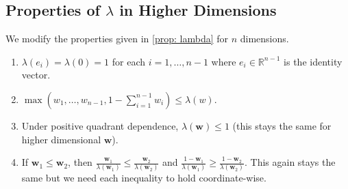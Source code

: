 \documentclass[12pt]{article}
\begin{document}
  \subsection{Properties of $\lambda$ in Higher Dimensions} \label{app: lambda highdim}
    We modify the properties given in \cref{prop: lambda} for $n$ dimensions.
    \begin{enumerate}
      \item $\lambda(e_i) = \lambda(0) = 1$ for each $i = 1,\dots,n-1$ where $e_i \in \mathbb{R}^{n - 1}$ is the identity vector.
      \item $\max(w_1,\dots,w_{n -1}, 1 - \sum_{i = 1}^{n - 1} w_i) \leq \lambda(w)$.
      \item Under positive quadrant dependence, $\lambda(\boldsymbol{w}) \leq 1$ (this stays the same for higher dimensional $\boldsymbol{w}$).
      \item If $\boldsymbol{w}_1 \leq \boldsymbol{w}_2$, then $\frac{\boldsymbol{w}_1}{\lambda(\boldsymbol{w}_1)} \leq \frac{\boldsymbol{w}_2}{\lambda(\boldsymbol{w}_2)}$ and $\frac{1 - \boldsymbol{w}_1}{\lambda(\boldsymbol{w}_1)} \geq \frac{1 - \boldsymbol{w}_2}{\lambda(\boldsymbol{w}_2)}$. This again stays the same but we need each inequality to hold coordinate-wise.
    \end{enumerate}
\end{document}
